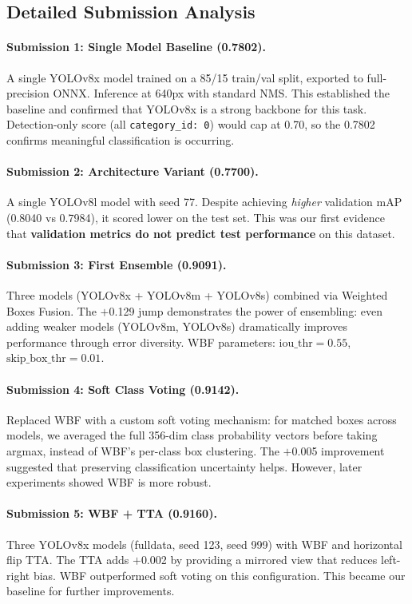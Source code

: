 \documentclass[11pt,a4paper]{article}
\begin{document}
\subsection{Detailed Submission Analysis}

\paragraph{Submission 1: Single Model Baseline (0.7802).}
A single YOLOv8x model trained on a 85/15 train/val split, exported to full-precision ONNX. Inference at 640px with standard NMS. This established the baseline and confirmed that YOLOv8x is a strong backbone for this task. Detection-only score (all \texttt{category\_id: 0}) would cap at 0.70, so the 0.7802 confirms meaningful classification is occurring.

\paragraph{Submission 2: Architecture Variant (0.7700).}
A single YOLOv8l model with seed 77. Despite achieving \emph{higher} validation mAP (0.8040 vs 0.7984), it scored lower on the test set. This was our first evidence that \textbf{validation metrics do not predict test performance} on this dataset.

\paragraph{Submission 3: First Ensemble (0.9091).}
Three models (YOLOv8x + YOLOv8m + YOLOv8s) combined via Weighted Boxes Fusion. The $+$0.129 jump demonstrates the power of ensembling: even adding weaker models (YOLOv8m, YOLOv8s) dramatically improves performance through error diversity. WBF parameters: $\text{iou\_thr}=0.55$, $\text{skip\_box\_thr}=0.01$.

\paragraph{Submission 4: Soft Class Voting (0.9142).}
Replaced WBF with a custom soft voting mechanism: for matched boxes across models, we averaged the full 356-dim class probability vectors before taking argmax, instead of WBF's per-class box clustering. The $+$0.005 improvement suggested that preserving classification uncertainty helps. However, later experiments showed WBF is more robust.

\paragraph{Submission 5: WBF + TTA (0.9160).}
Three YOLOv8x models (fulldata, seed 123, seed 999) with WBF and horizontal flip TTA. The TTA adds $+$0.002 by providing a mirrored view that reduces left-right bias. WBF outperformed soft voting on this configuration. This became our baseline for further improvements.
\end{document}

